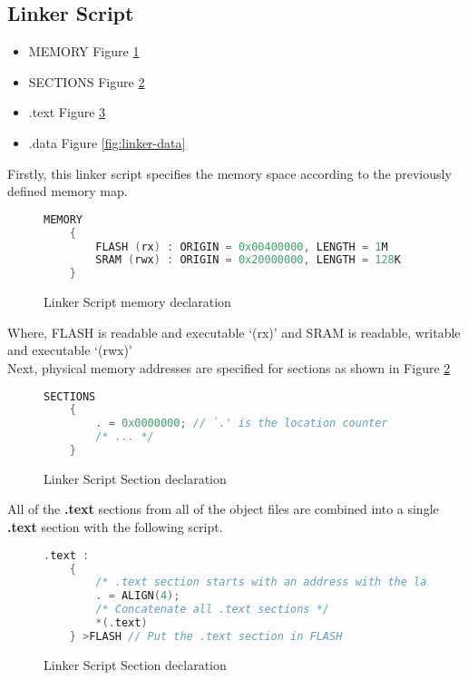 \subsection{Linker Script}
\begin{itemize}
    \item MEMORY Figure \ref{fig:linker-mem}
    \item SECTIONS Figure \ref{fig:linker-sections}
    \item .text Figure \ref{fig:linker-text}
    \item .data Figure \ref{fig:linker-data}
\end{itemize}
Firstly, this linker script specifies the memory space according to the previously defined memory map.

\begin{figure}[H]
    \begin{center}
    \begin{lstlisting}[language=C]
    MEMORY
    {
        FLASH (rx) : ORIGIN = 0x00400000, LENGTH = 1M
        SRAM (rwx) : ORIGIN = 0x20000000, LENGTH = 128K
    }
    \end{lstlisting}
    \end{center}
    \caption{Linker Script memory declaration}
    \label{fig:linker-mem}
\end{figure}

Where, FLASH is readable and executable `(rx)' and SRAM is readable, writable and executable `(rwx)'\\

Next, physical memory addresses are specified for sections as shown in Figure \ref{fig:linker-sections}

\begin{figure}[H]
    \begin{center}
    \begin{lstlisting}[language=C]
    SECTIONS
    {
        . = 0x0000000; // `.' is the location counter
        /* ... */
    }
    \end{lstlisting}
    \end{center}
    \caption{Linker Script Section declaration}
    \label{fig:linker-sections}
\end{figure}

All of the \textbf{.text} sections from all of the object files are combined into a single \textbf{.text} section with
the following script.

\begin{figure}[H]
    \begin{center}
    \begin{lstlisting}[language=C]
    .text :
    {
        /* .text section starts with an address with the last two bits = `00' */
        . = ALIGN(4); 
        /* Concatenate all .text sections */
        *(.text)
    } >FLASH // Put the .text section in FLASH
    \end{lstlisting}
    \end{center}
    \caption{Linker Script Section declaration}
    \label{fig:linker-text}
\end{figure}

